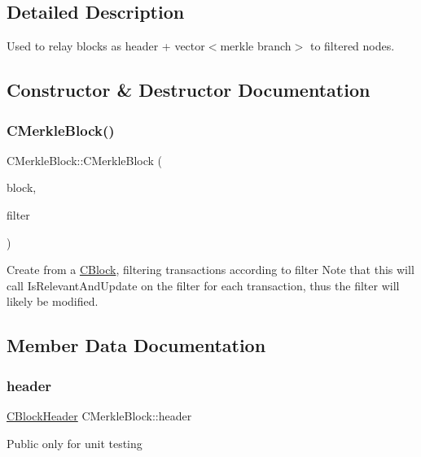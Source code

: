 \subsection{Detailed Description}
Used to relay blocks as header + vector$<$merkle branch$>$ to filtered nodes. 

\subsection{Constructor \& Destructor Documentation}
\mbox{\label{class_c_merkle_block_a5d08ce7034216ca25b0f9eab6bf8c389}} 
\subsubsection{\texorpdfstring{CMerkleBlock()}{CMerkleBlock()}}
{\footnotesize\ttfamily C\+Merkle\+Block\+::\+C\+Merkle\+Block (\begin{DoxyParamCaption}\item[{const \mbox{\hyperlink{class_c_block}{C\+Block}} \&}]{block,  }\item[{\mbox{\hyperlink{class_c_bloom_filter}{C\+Bloom\+Filter}} \&}]{filter }\end{DoxyParamCaption})}

Create from a \mbox{\hyperlink{class_c_block}{C\+Block}}, filtering transactions according to filter Note that this will call Is\+Relevant\+And\+Update on the filter for each transaction, thus the filter will likely be modified. 

\subsection{Member Data Documentation}
\mbox{\label{class_c_merkle_block_a3c1fcef77eee1b476b3f3fd52055748a}} 
\subsubsection{\texorpdfstring{header}{header}}
{\footnotesize\ttfamily \mbox{\hyperlink{class_c_block_header}{C\+Block\+Header}} C\+Merkle\+Block\+::header}

Public only for unit testing \mbox{\label{class_c_merkle_block_a73bbbdcb5d83588b15461c02d0228999}} 
